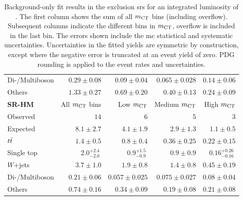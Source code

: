 \begin{table}
\begin{center}
{\begin{tabular}{lrrrr}
Di-/Multiboson          & $0.29 \pm 0.08$          & $0.09 \pm 0.04$          & $0.065 \pm 0.028$          & $0.14 \pm 0.06$              \\
Others          & $1.33 \pm 0.27$          & $0.69 \pm 0.20$          & $0.40 \pm 0.13$          & $0.24 \pm 0.09$              \\
\bottomrule
\textbf{ SR-HM}           & All $m_{\textrm{CT}}$ bins          & Low $m_{\textrm{CT}}$         & Medium $m_{\textrm{CT}}$        & High $m_{\textrm{CT}}$    \\[-0.05cm]
\midrule
Observed           & $14$              & $6$              & $5$              & $3$                    \\
\midrule
 Expected          & $8.1 \pm 2.7$          & $4.1 \pm 1.9$          & $2.9 \pm 1.3$          & $1.1 \pm 0.5$              \\
\midrule
         $t\bar{t}$          & $1.4 \pm 0.5$          & $0.8 \pm 0.4$          & $0.36 \pm 0.25$          & $0.22 \pm 0.15$              \\
Single top          & $2.0_{-2.0}^{+2.4}~$          & $0.9_{-0.9}^{+1.5}~$         & $0.9 \pm 0.9$          & $0.16_{-0.16}^{+0.26}~$              \\
$W$+jets           & $3.7 \pm 1.0$          & $1.9 \pm 0.8$          & $1.4 \pm 0.8$          & $0.45 \pm 0.19$              \\
Di-/Multiboson          & $0.21 \pm 0.06$          & $0.057 \pm 0.025$          & $0.075 \pm 0.027$          & $0.08 \pm 0.04$              \\
Others          & $0.74 \pm 0.16$          & $0.34 \pm 0.09$          & $0.19 \pm 0.08$          & $0.21 \pm 0.08$              \\
\bottomrule
\end{tabular}
}
\end{center}
\caption{ Background-only fit results in the exclusion \glspl{sr} for an integrated luminosity of \onethirtynineifb. The first column shows the sum of all $m_{\textrm{CT}}$ bins (including overflow). Subsequent columns indicate the different bins in $m_{\textrm{CT}}$, overflow is included in the last bin. The errors shown include the \gls{mc} statistical and systematic uncertainties. Uncertainties in the fitted yields are symmetric by construction, except where the negative error is truncated at an event yield of zero. PDG rounding is applied to the event rates and uncertainties.}\label{tab:results_bkg_only_SR}
\end{table}
%
